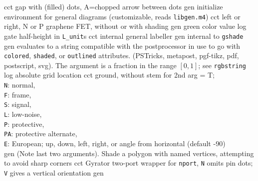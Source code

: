 %
  {cct}%
  {gap with (filled) dots, A=chopped arrow between dots}%
%
  {gen}%
  {initialize environment for general diagrams
    (customizable, reads {\tt libgen.m4})}%
%
  {cct}%
  {left or right, N or P graphene FET, without or with shading
    }%
%
  {gen}%
  {green color value}%
%
  {log}%
  {gate half-height in {\tt L\_unit}s}%
%
  {cct}%
  {internal general labeller}%
%
  {gen}%
  {internal to {\tt gshade}}%
%
  {gen}%
  {evaluates to a string compatible with the postprocessor in use
   to go with {\tt colored}, {\tt shaded}, or {\tt outlined} attributes.
   (PSTricks, metapost, pgf-tikz, pdf, postscript, svg).
   The argument is a fraction in the range $[0,1]$; see {\tt rgbstring}}%
%
  {log}%
  {absolute grid location}%
%
  {cct}%
  { ground, without stem for 2nd arg = T;\\
    {\tt N}: normal,\\
    {\tt F}: frame,\\
    {\tt S}: signal,\\
    {\tt L}: low-noise,\\
    {\tt P}: protective,\\
    {\tt PA}: protective alternate,\\
    {\tt E}: European; up, down, left, right, or angle
    from horizontal (default -90) \\
   }%
%
  {gen}%
  {(Note last two arguments).  Shade a polygon with named
    vertices, attempting to avoid sharp corners}%
%
  {cct}%
  {Gyrator two-port wrapper for {\tt nport}, {\tt N} omits pin dots; {\tt V}%
   gives a vertical orientation
   }%
%
%
%
  {gen}%
